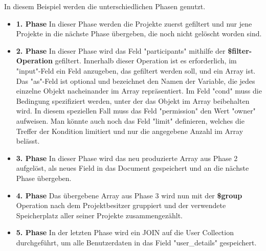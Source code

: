 In diesem Beispiel werden die unterschiedlichen Phasen genutzt.
\begin{itemize}
    \item \textbf{1. Phase}
        \newline
        In dieser Phase werden die Projekte zuerst gefiltert und nur jene Projekte in die nächste Phase übergeben, die noch nicht gelöscht worden sind.
    \item \textbf{2. Phase}
        \newline
        In dieser Phase wird das Feld "participants" mithilfe der \textbf{\$filter-Operation} gefiltert. Innerhalb dieser Operation ist es erforderlich, im "input"-Feld ein Feld anzugeben, das gefiltert werden soll, und ein Array ist. Das "as"-Feld ist optional und bezeichnet den Namen der Variable, die jedes einzelne Objekt nacheinander im Array repräsentiert. Im Feld "cond" muss die Bedingung spezifiziert werden, unter der das Objekt im Array beibehalten wird. In diesem speziellen Fall muss das Feld "permission" den Wert "owner" aufweisen. Man könnte auch noch das Feld "limit" definieren, welches die Treffer der Kondition limitiert und nur die angegebene Anzahl im Array belässt.
    \item \textbf{3. Phase}
        \newline
        In dieser Phase wird das neu produzierte Array aus Phase 2 aufgelöst, als neues Field in das Document gespeichert und an die nächste Phase übergeben.
    \item \textbf{4. Phase}
        \newline
        Das übergebene Array aus Phase 3 wird nun mit der \textbf{\$group} Operation nach dem Projektbesitzer gruppiert und der verwendete Speicherplatz aller seiner Projekte zusammengezählt.
    \item \textbf{5. Phase}
        \newline
        In der letzten Phase wird ein JOIN auf die User Collection durchgeführt, um alle Benutzerdaten in das Field "user\_details" gespeichert.
\end{itemize}
\cite{mongodb_aggregation_filter}